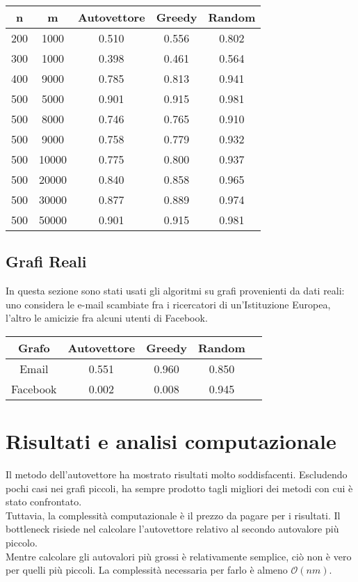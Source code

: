 \documentclass{article}
\begin{document}
\begin{center}
    \begin{tabular}{|c|c|c|c|c|}
        \hline
        n & m & Autovettore & Greedy & Random \\
        \hline
        \hline
        200 & 1000 & 0.510 & 0.556 & 0.802 \\
        300 & 1000 & 0.398 & 0.461 & 0.564 \\
        400 & 9000 & 0.785 & 0.813 & 0.941 \\
        500 & 5000 & 0.901 & 0.915 & 0.981 \\
        500 & 8000 & 0.746 & 0.765 & 0.910 \\
        500 & 9000 & 0.758 & 0.779 & 0.932 \\
        500 & 10000 & 0.775 & 0.800 & 0.937 \\
        500 & 20000 & 0.840 & 0.858 & 0.965 \\
        500 & 30000 & 0.877 & 0.889 & 0.974 \\
        500 & 50000 & 0.901 & 0.915 & 0.981 \\
        \hline
    \end{tabular}
\end{center}

\subsection{Grafi Reali}

In questa sezione sono stati usati gli algoritmi su grafi provenienti da dati reali:
uno considera le e-mail scambiate fra i ricercatori di un'Istituzione Europea, l'altro le amicizie fra alcuni utenti di Facebook.

\begin{center}
    \begin{tabular}{|c|c|c|c|c|}
        \hline
        Grafo & Autovettore & Greedy & Random \\
        \hline
        \hline
        Email & 0.551 & 0.960 & 0.850 \\
        Facebook & 0.002 & 0.008 & 0.945 \\
        \hline
    \end{tabular}
\end{center}




\section{Risultati e analisi computazionale}
Il metodo dell'autovettore ha mostrato risultati molto soddisfacenti. Escludendo pochi casi nei grafi piccoli, ha sempre prodotto tagli migliori dei metodi con cui \`e stato confrontato.\\
Tuttavia, la complessit\`a computazionale \`e il prezzo da pagare per i risultati. Il bottleneck risiede nel calcolare l'autovettore relativo al secondo autovalore pi\`u piccolo.\\
Mentre calcolare gli autovalori pi\`u grossi \`e relativamente semplice, ci\`o non \`e vero per quelli pi\`u piccoli. La complessit\`a necessaria per farlo \`e almeno $\mathcal{O}(nm)$. 
\end{document}
